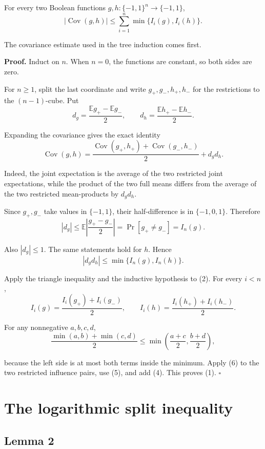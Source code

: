 \documentclass[
  american,
  11pt,
]{article}
\begin{document}
For every two Boolean functions \(g,h:\{-1,1\}^n\to\{-1,1\}\), \[
|\operatorname{Cov}(g,h)|\leq
\sum_{i=1}^n\min\{I_i(g),I_i(h)\}.
\tag{1}
\]

The covariance estimate used in the tree induction comes first.

\textbf{Proof.} Induct on \(n\). When \(n=0\), the functions are
constant, so both sides are zero.

For \(n\geq1\), split the last coordinate and write \(g_+,g_-,h_+,h_-\)
for the restrictions to the \((n-1)\)-cube. Put \[
d_g=\frac{\mathbb E g_+-\mathbb E g_-}{2},
\qquad
d_h=\frac{\mathbb E h_+-\mathbb E h_-}{2}.
\]

Expanding the covariance gives the exact identity \[
\operatorname{Cov}(g,h)
=\frac{\operatorname{Cov}(g_+,h_+)+\operatorname{Cov}(g_-,h_-)}2+d_gd_h.
\tag{2}
\]

Indeed, the joint expectation is the average of the two restricted joint
expectations, while the product of the two full means differs from the
average of the two restricted mean-products by \(d_gd_h\).

Since \(g_+,g_-\) take values in \(\{-1,1\}\), their half-difference is
in \(\{-1,0,1\}\). Therefore \[
|d_g|
\leq\mathbb E\left|\frac{g_+-g_-}{2}\right|
=\Pr[g_+\ne g_-]
=I_n(g).
\tag{3}
\]

Also \(|d_g|\leq1\). The same statements hold for \(h\). Hence \[
|d_gd_h|\leq\min\{I_n(g),I_n(h)\}.
\tag{4}
\]

Apply the triangle inequality and the inductive hypothesis to (2). For
every \(i<n\), \[
I_i(g)=\frac{I_i(g_+)+I_i(g_-)}2,
\qquad
I_i(h)=\frac{I_i(h_+)+I_i(h_-)}2.
\tag{5}
\]

For any nonnegative \(a,b,c,d\), \[
\frac{\min(a,b)+\min(c,d)}2
\leq\min\left(\frac{a+c}2,\frac{b+d}2\right),
\tag{6}
\]

because the left side is at most both terms inside the minimum. Apply
(6) to the two restricted influence pairs, use (5), and add (4). This
proves (1). \(\square\)

\section{The logarithmic split
inequality}\label{the-logarithmic-split-inequality}

\subsection*{Lemma 2}\label{lemma-2}
\end{document}
